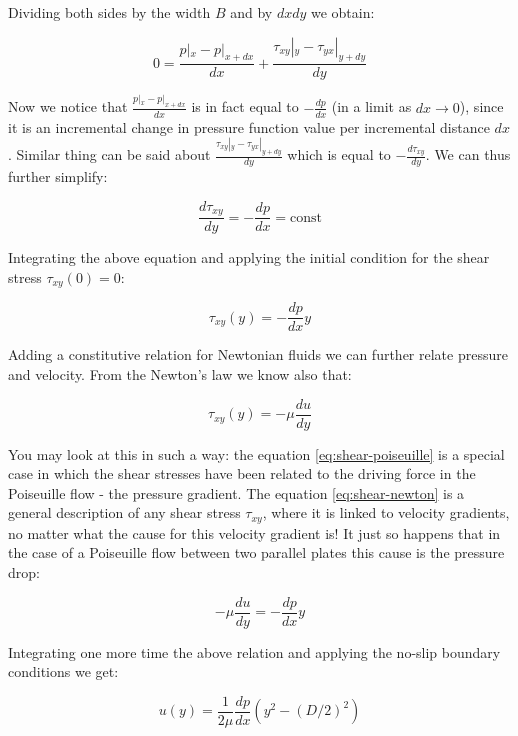 Dividing both sides by the width $B$ and by $dx dy$ we obtain:

\begin{equation}
0 = \frac{p|_x  - p|_{x+dx}}{dx}  + \frac{\tau_{xy}|_y  - \tau_{yx}|_{y+dy}}{dy} 
\end{equation}

Now we notice that $\frac{p|_x  - p|_{x+dx}}{dx}$ is in fact equal to $-\frac{dp}{dx}$ (in a limit as $dx \rightarrow 0$), since it is an incremental change in pressure function value per incremental distance $dx$. Similar thing can be said about $\frac{\tau_{xy}|_y  - \tau_{yx}|_{y+dy}}{dy}$ which is equal to $-\frac{d \tau_{xy}}{dy}$. We can thus further simplify:

\begin{equation}
\frac{d \tau_{xy}}{dy} = - \frac{dp}{dx} = \text{const}
\end{equation}

Integrating the above equation and applying the initial condition for the shear stress $\tau_{xy}(0) = 0$:

\begin{equation} \label{eq:shear-poiseuille}
\tau_{xy}(y)= - \frac{dp}{dx} y
\end{equation}

Adding a constitutive relation for Newtonian fluids we can further relate pressure and velocity. From the Newton's law we know also that:

\begin{equation} \label{eq:shear-newton}
\tau_{xy}(y)= - \mu \frac{du}{dy}
\end{equation}

You may look at this in such a way: the equation \ref{eq:shear-poiseuille} is a special case in which the shear stresses have been related to the driving force in the Poiseuille flow - the pressure gradient. The equation \ref{eq:shear-newton} is a general description of any shear stress $\tau_{xy}$, where it is linked to velocity gradients, no matter what the cause for this velocity gradient is! It just so happens that in the case of a Poiseuille flow between two parallel plates this cause is the pressure drop:

\begin{equation}
- \mu \frac{du}{dy} = - \frac{dp}{dx} y
\end{equation}

Integrating one more time the above relation and applying the no-slip boundary conditions we get:

\begin{equation}
u(y) = \frac{1}{2 \mu} \frac{dp}{dx} (y^2 - (D/2)^2)
\end{equation}


